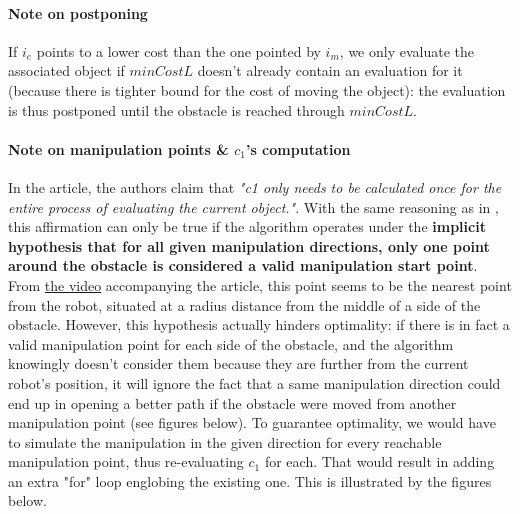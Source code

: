 \paragraph{Note on postponing}\label{postponing_note} If $i_{e}$ points to a lower cost than the one pointed by $i_{m}$, we only evaluate the associated object if $minCostL$ doesn't already contain an evaluation for it (because there is tighter bound for the cost of moving the object): the evaluation is thus postponed until the obstacle is reached through $minCostL$.

\paragraph{Note on manipulation points \& $c_{1}$'s computation}\label{c1_computation_note} In the article, the authors claim that \textit{"c1 only needs to be calculated once for the entire process of evaluating the current object."}. With the same reasoning as in , this affirmation can only be true if the algorithm operates under the \textbf{implicit hypothesis that for all given manipulation directions, only one point around the obstacle is considered a valid manipulation start point}. From \href{https://youtu.be/3AvfPVzBb-s}{the video} accompanying the article, this point seems to be the nearest point from the robot, situated at a radius distance from the middle of a side of the obstacle. However, this hypothesis actually hinders optimality: if there is in fact a valid manipulation point for each side of the obstacle, and the algorithm knowingly doesn't consider them because they are further from the current robot's position, it will ignore the fact that a same manipulation direction could end up in opening a better path if the obstacle were moved from another manipulation point (see figures below). To guarantee optimality, we would have to simulate the manipulation in the given direction for every reachable manipulation point, thus re-evaluating $c_{1}$ for each. That would result in adding an extra "for" loop englobing the existing one. This is illustrated by the figures below.


